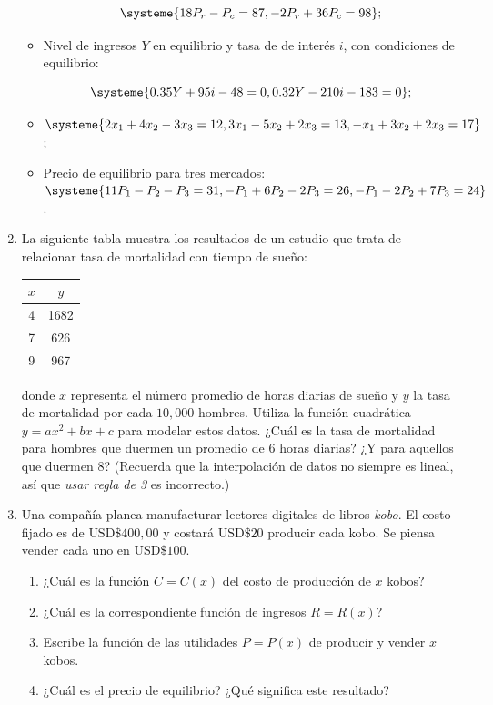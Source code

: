 \documentclass[8pt,a4paper]{article}
\begin{document}
\begin{enumerate}
\begin{itemize}
			\[ \systeme{18P_r-P_c=87,-2P_r+36P_c=98};\]
			
			\item Nivel de ingresos $Y$ en equilibrio y tasa de de interés $i$, con condiciones de equilibrio: 
			
			\[ \systeme{0.35Y+95i-48=0,0.32Y-210i-183=0}; \]
			\item $\displaystyle \systeme{2x_1+4x_2-3x_3=12,3x_1-5x_2+2x_3=13,-x_1+3x_2+2x_3=17}$;
			\item Precio de equilibrio para tres mercados: $\displaystyle \systeme{11P_1-P_2-P_3=31,-P_1+6P_2-2P_3=26,-P_1-2P_2+7P_3=24}$.
		\end{itemize}
		
		\item La siguiente tabla muestra los resultados de un estudio que trata de relacionar tasa de mortalidad con tiempo de sueño:
		
		\begin{center}
			\begin{tabular}{c|c}
			$x$ & $y$ \\
			\hline
			4 & 1682 \\
			7 & 626 \\
			9 & 967
			\end{tabular}
		\end{center}
donde $x$ representa el número promedio de horas diarias de sueño y $y$ la tasa de mortalidad por cada $10,000$ hombres. Utiliza la función cuadrática $y=ax^2+bx+c$ para modelar estos datos. ¿Cuál es la tasa de mortalidad para hombres que duermen un promedio de 6 horas diarias? ¿Y para aquellos que duermen 8? (Recuerda que la interpolación de datos no siempre es lineal, así que \textit{usar regla de 3} es incorrecto.)

	\item Una compañía planea manufacturar lectores digitales de libros \textit{kobo}. El costo fijado es de $\textrm{USD}\$400,00$ y costará $\textrm{USD}\$20$ producir cada kobo. Se piensa vender cada uno en $\textrm{USD}\$100$.

		\begin{enumerate}
			\item ¿Cuál es la función $C=C(x)$ del costo de producción de $x$ kobos?
			\item ¿Cuál es la correspondiente función de ingresos $R=R(x)$?
			\item Escribe la función de las utilidades $P=P(x)$ de producir y vender $x$ kobos.
			\item ¿Cuál es el precio de equilibrio? ¿Qué significa este resultado?
		\end{enumerate}
	

\end{enumerate}
\end{document}
